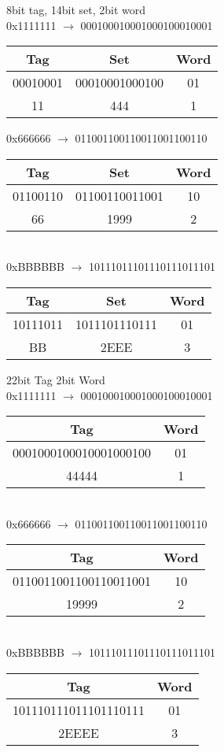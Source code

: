 \documentclass[12pt,largemargins]{homework}
\begin{document}
\begin{alphaparts}
\item
8bit tag, 14bit set, 2bit word\\
0x1111111 $\rightarrow$ 000100010001000100010001\\
\begin{tabular}{|c|c|c|}
\hline
Tag & Set & Word \\
\hline
00010001 & 00010001000100 & 01 \\
\hline
11&444&1\\
\hline
\end{tabular}

0x666666 $\rightarrow$ 011001100110011001100110\\
\begin{tabular}{|c|c|c|}
\hline
Tag & Set & Word \\
\hline
01100110&01100110011001&10\\
\hline
66&1999&2\\
\hline
\end{tabular}\\
0xBBBBBB $\rightarrow$ 10111011101110111011101\\
\begin{tabular}{|c|c|c|}
\hline
Tag & Set & Word \\
\hline
10111011&1011101110111&01\\
\hline
BB&2EEE&3\\
\hline
\end{tabular}
\item
22bit Tag 2bit Word\\
0x1111111 $\rightarrow$ 000100010001000100010001\\
\begin{tabular}{|c|c|}
\hline
Tag&Word\\
\hline
0001000100010001000100&01\\
\hline
44444&1\\
\hline
\end{tabular}\\
0x666666 $\rightarrow$ 011001100110011001100110\\
\begin{tabular}{|c|c|}
\hline
Tag&Word\\
\hline
0110011001100110011001&10\\
\hline
19999&2\\
\hline
\end{tabular}\\
\newpage
0xBBBBBB $\rightarrow$ 10111011101110111011101\\
\begin{tabular}{|c|c|}
\hline
Tag&Word\\
\hline
101110111011101110111&01\\
\hline
2EEEE&3\\
\hline
\end{tabular}\\
\end{alphaparts}
\end{document}

